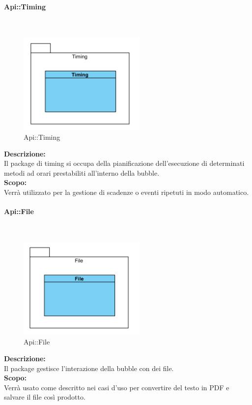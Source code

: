 \begin{samepage}
\paragraph{Api\-::Timing}\label{api-timing}\mbox{}\\
\nopagebreak
\begin{figure}[H]
	\centering
	\includegraphics[height=5cm]{diagrammi_img/classi_e_package/api_timing.png}
	\caption{Api\-::Timing}
\end{figure}
\end{samepage}
\textbf{Descrizione:}\\
Il package di timing si occupa della pianificazione dell'esecuzione di determinati metodi ad orari prestabiliti all'interno della bubble.\\
\textbf{Scopo:}\\
Verrà utilizzato per la gestione di scadenze o eventi ripetuti in modo automatico.

\begin{samepage}
\paragraph{Api\-::File}\label{api-file}\mbox{}\\
\nopagebreak
\begin{figure}[H]
	\centering
	\includegraphics[height=5cm]{diagrammi_img/classi_e_package/api_file.png}
	\caption{Api\-::File}
\end{figure}
\end{samepage}
\textbf{Descrizione:}\\ 
Il package gestisce l'interazione della bubble con dei file.\\ 
\textbf{Scopo:}\\
Verrà usato come descritto nei casi d'uso per convertire del testo in PDF e salvare il file così prodotto.


